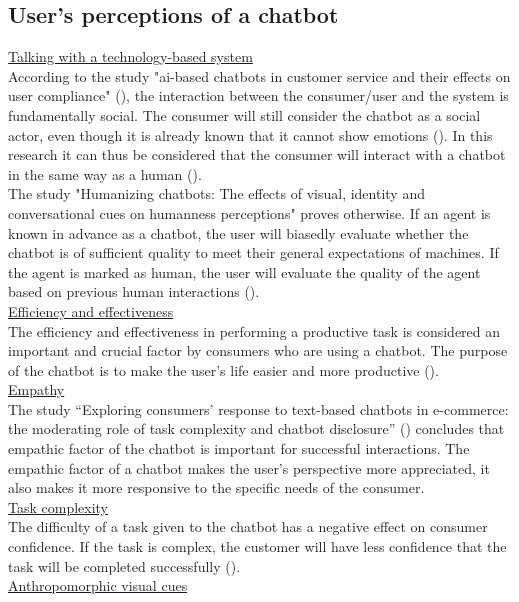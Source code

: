 \subsection{User’s perceptions of a chatbot}
\ul{Talking with a technology-based system}\\
According to the study "\acrshort{ai}-based chatbots in customer service and their effects on user compliance" (\cite{Adam2021}), the interaction between the consumer/user and the system is fundamentally social. The consumer will still consider the chatbot as a social actor, even though it is already known that it cannot show emotions (\cite{Adam2021}). In this research it can thus be considered that the consumer will interact with a chatbot in the same way as a human (\cite{Cheng2021,Ischen2020}).\\
\break
The study "Humanizing chatbots: The effects of visual, identity and conversational cues on humanness perceptions" proves otherwise. If an agent is known in advance as a chatbot, the user will biasedly evaluate whether the chatbot is of sufficient quality to meet their general expectations of machines. If the agent is marked as human, the user will evaluate the quality of the agent based on previous human interactions (\cite{Go2019,Shyam2008}).\\
\break
\ul{Efficiency and effectiveness}\\
The efficiency and effectiveness in performing a productive task is considered an important and crucial factor by consumers who are using a chatbot. The purpose of the chatbot is to make the user's life easier and more productive (\cite{Brandtzaeg2018}).\\
\break
\ul{Empathy}\\
The study “Exploring consumers' response to text-based chatbots in e-commerce: the moderating role of task complexity and chatbot disclosure” (\cite{Cheng2021}) concludes that empathic factor of the chatbot is important for successful interactions. The empathic factor of a chatbot makes the user's perspective more appreciated, it also makes it more responsive to the specific needs of the consumer.\\
\break
\ul{Task complexity}\\
The difficulty of a task given to the chatbot has a negative effect on consumer confidence. If the task is complex, the customer will have less confidence that the task will be completed successfully (\cite{Cheng2021}).\\
\break
\ul{Anthropomorphic visual cues}\\
